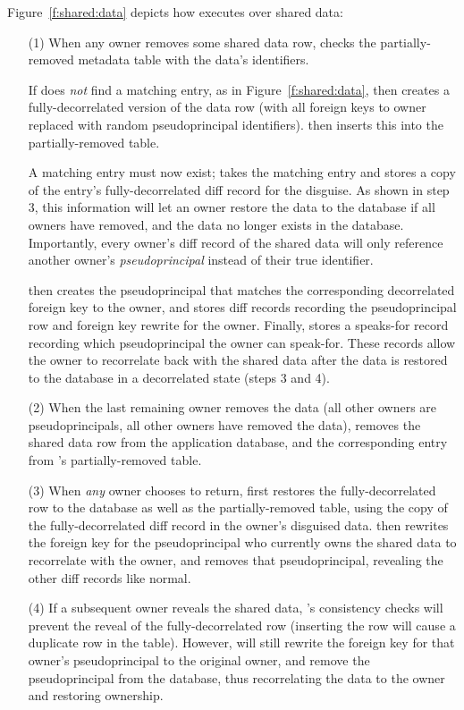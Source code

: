 Figure~\ref{f:shared:data} depicts how \sys executes \sys over shared
data:
%
\begin{enumerate}
    \item[(1)] When any owner removes some shared data row, \sys checks the
        partially-removed metadata table with the data's identifiers.
        
        If \sys does \emph{not} find a matching entry, as in
        Figure~\ref{f:shared:data}, then \sys creates a fully-decorrelated
        version of the data row (with all foreign keys to owner replaced with
        random pseudoprincipal identifiers). \sys then inserts this into the
        partially-removed table.

        A matching entry must now exist; \sys takes the matching entry and
        stores a copy of the entry's fully-decorrelated diff record for the
        disguise.  As shown in step 3, this information will let an owner
        restore the data to the database if all owners have removed, and the
        data no longer exists in the database.  Importantly, every owner's diff
        record of the shared data will only reference another owner's
        \emph{pseudoprincipal} instead of their true identifier.

        \sys then creates the pseudoprincipal that matches the corresponding
        decorrelated foreign key to the owner, and stores diff records recording
        the pseudoprincipal row and foreign key rewrite for the owner. Finally,
        \sys stores a speaks-for record recording which pseudoprincipal the
        owner can speak-for. These records allow the owner to recorrelate back
        with the shared data after the data is restored to the database in a
        decorrelated state (steps 3 and 4).

\item[(2)]
        When the last remaining owner removes the data (all other owners are
        pseudoprincipals, \ie all other owners have removed the data), \sys
        removes the shared data row from the application database, and the
        corresponding entry from \sys's partially-removed table.
%

\item[(3)]
When \emph{any} owner chooses to return, \sys first restores the
fully-decorrelated row to the database as well as the partially-removed table,
        using the copy of the fully-decorrelated diff record in
the owner's disguised data.  \sys then rewrites the foreign key for the
pseudoprincipal who currently owns the shared data to recorrelate with the
owner, and removes that pseudoprincipal, revealing the other diff records like
normal. 
%

\item[(4)] If a subsequent owner reveals the shared data, \sys's consistency
    checks will prevent the reveal of the fully-decorrelated row (inserting the
        row will cause a duplicate row in the table). However, \sys will still
        rewrite the foreign key for that owner's pseudoprincipal to the original
        owner, and remove the pseudoprincipal from the database, thus
        recorrelating the data to the owner and restoring ownership.
%
\end{enumerate}

